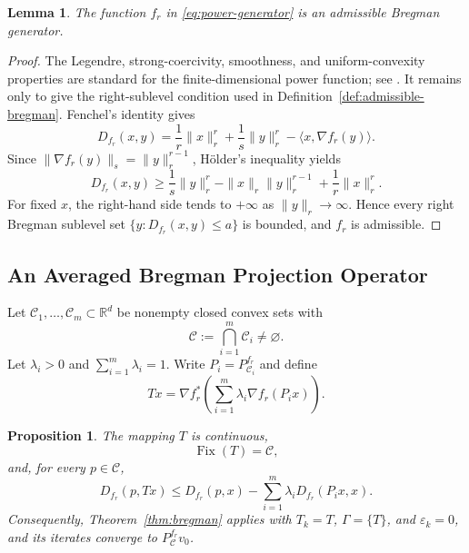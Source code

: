 \documentclass[leqno,12pt]{amsart}
\def\R{\mathbb{R}}
\newtheorem{lemma}[theorem]{Lemma}
\newtheorem{proposition}[theorem]{Proposition}
\theoremstyle{definition}
\theoremstyle{remark}
\numberwithin{equation}{section}
\newcommand{\C}{\mathscr{C}}
\newcommand{\Fix}{\operatorname{Fix}}
\begin{document}
\begin{lemma}\label{lem:power-generator}
The function $f_r$ in \eqref{eq:power-generator} is an admissible Bregman
generator.
\end{lemma}

\begin{proof}
The Legendre, strong-coercivity, smoothness, and uniform-convexity properties
are standard for the finite-dimensional power function; see
\cite{BauschkeBorwein1997,ButnariuIusem2000,
ButnariuIusemZalinescu2003}. It remains only to give the right-sublevel
condition used in Definition~\ref{def:admissible-bregman}. Fenchel's identity
gives
\[
 D_{f_r}(x,y)=\frac1r\|x\|_r^r+\frac1s\|y\|_r^r
 -\langle x,\nabla f_r(y)\rangle.
\]
Since $\|\nabla f_r(y)\|_s=\|y\|_r^{r-1}$, H\"older's inequality yields
\[
 D_{f_r}(x,y)\geq
 \frac1s\|y\|_r^r-\|x\|_r\|y\|_r^{r-1}
 +\frac1r\|x\|_r^r.
\]
For fixed $x$, the right-hand side tends to $+\infty$ as
$\|y\|_r\to\infty$. Hence every right Bregman sublevel set
$\{y:D_{f_r}(x,y)\leq a\}$ is bounded, and $f_r$ is admissible.
\end{proof}

\subsection{An Averaged Bregman Projection Operator}

Let
$\C_1,\ldots,\C_m\subset\R^d$ be nonempty closed convex sets with
\[
 \C:=\bigcap_{i=1}^{m}\C_i\neq\varnothing.
\]
Let $\lambda_i>0$ and $\sum_{i=1}^{m}\lambda_i=1$. Write
$P_i=P_{\C_i}^{f_r}$ and define
\[
 Tx=\nabla f_r^*\!\left(\sum_{i=1}^{m}\lambda_i\nabla f_r(P_i x)\right).
\]

\begin{proposition}\label{prop:averaged-bregman}
The mapping $T$ is continuous,
\[
 \Fix(T)=\C,
\]
and, for every $p\in\C$,
\begin{equation}\label{eq:strict-bregman-fejer}
 D_{f_r}(p,Tx)
 \leq D_{f_r}(p,x)-\sum_{i=1}^{m}\lambda_iD_{f_r}(P_i x,x).
\end{equation}
Consequently, Theorem~\ref{thm:bregman} applies with $T_k=T$,
$\Gamma=\{T\}$, and $\varepsilon_k=0$, and its iterates converge to
$P_{\C}^{f_r}v_0$.
\end{proposition}
\end{document}
